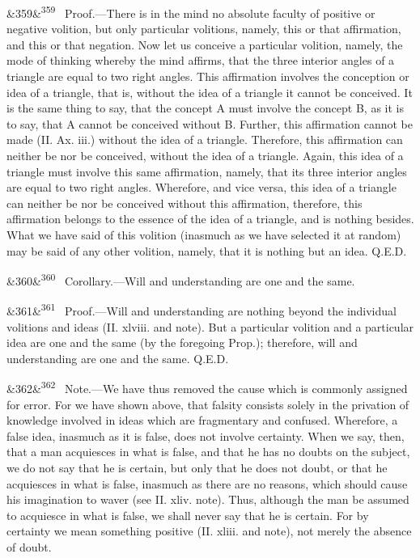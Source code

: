 \documentclass[12pt]{article}
\newcommand{\para}[1][]{\par\noindent\ifx&#1&\else\textsuperscript{\footnotesize #1}~\fi}
\begin{document}
\para[359] Proof.---There is in the mind no absolute faculty of positive or negative volition, but only particular volitions, namely, this or that affirmation, and this or that negation. Now let us conceive a particular volition, namely, the mode of thinking whereby the mind affirms, that the three interior angles of a triangle are equal to two right angles. This affirmation involves the conception or idea of a triangle, that is, without the idea of a triangle it cannot be conceived. It is the same thing to say, that the concept A must involve the concept B, as it is to say, that A cannot be conceived without B. Further, this affirmation cannot be made (II. Ax. iii.) without the idea of a triangle. Therefore, this affirmation can neither be nor be conceived, without the idea of a triangle. Again, this idea of a triangle must involve this same affirmation, namely, that its three interior angles are equal to two right angles. Wherefore, and vice versa, this idea of a triangle can neither be nor be conceived without this affirmation, therefore, this affirmation belongs to the essence of the idea of a triangle, and is nothing besides. What we have said of this volition (inasmuch as we have selected it at random) may be said of any other volition, namely, that it is nothing but an idea. Q.E.D.

\para[360] Corollary.---Will and understanding are one and the same.

\para[361] Proof.---Will and understanding are nothing beyond the individual volitions and ideas (II. xlviii. and note). But a particular volition and a particular idea are one and the same (by the foregoing Prop.); therefore, will and understanding are one and the same. Q.E.D.

\para[362] Note.---We have thus removed the cause which is commonly assigned for error. For we have shown above, that falsity consists solely in the privation of knowledge involved in ideas which are fragmentary and confused. Wherefore, a false idea, inasmuch as it is false, does not involve certainty. When we say, then, that a man acquiesces in what is false, and that he has no doubts on the subject, we do not say that he is certain, but only that he does not doubt, or that he acquiesces in what is false, inasmuch as there are no reasons, which should cause his imagination to waver (see II. xliv. note). Thus, although the man be assumed to acquiesce in what is false, we shall never say that he is certain. For by certainty we mean something positive (II. xliii. and note), not merely the absence of doubt.
\end{document}
